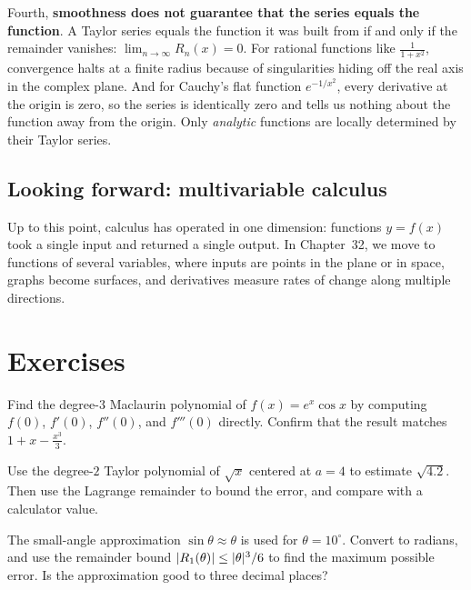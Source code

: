 Fourth, \textbf{smoothness does not guarantee that the series equals the function}. A Taylor series
equals the function it was built from if and only if the remainder vanishes: $\lim_{n\to\infty} R_n(x) = 0$.
For rational functions like $\frac{1}{1+x^2}$, convergence halts at a finite radius because of
singularities hiding off the real axis in the complex plane. And for Cauchy's flat function
$e^{-1/x^2}$, every derivative at the origin is zero, so the series is identically zero and
tells us nothing about the function away from the origin. Only \emph{analytic} functions are
locally determined by their Taylor series.

\subsection{Looking forward: multivariable calculus}

Up to this point, calculus has operated in one dimension: functions $y=f(x)$ took a single input
and returned a single output. In Chapter~32, we move
to functions of several variables, where inputs are points in the plane or in space, graphs become
surfaces, and derivatives measure rates of change along multiple directions.

\section{Exercises}

\begin{exercise}
Find the degree-$3$ Maclaurin polynomial of $f(x) = e^{x}\cos x$ by computing
$f(0)$, $f'(0)$, $f''(0)$, and $f'''(0)$ directly. Confirm that the result matches
$1 + x - \tfrac{x^3}{3}$.
\end{exercise}

\begin{exercise}
Use the degree-$2$ Taylor polynomial of $\sqrt{x}$ centered at $a = 4$ to estimate
$\sqrt{4.2}$. Then use the Lagrange remainder to bound the error, and compare with a
calculator value.
\end{exercise}

\begin{exercise}
The small-angle approximation $\sin\theta \approx \theta$ is used for
$\theta = 10^\circ$. Convert to radians, and use the remainder bound
$\lvert R_1(\theta)\rvert \le \lvert\theta\rvert^3/6$ to find the maximum possible error. Is the
approximation good to three decimal places?
\end{exercise}


